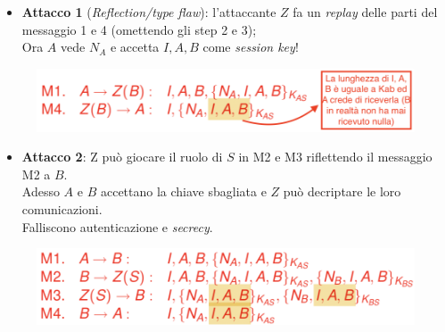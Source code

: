 \documentclass[11pt, a4paper, twoside, italian]{report}
\theoremstyle{plain}
\begin{document}
\begin{multicols}{2}
\begin{itemize}
		\item \textbf{Attacco 1} (\textit{Reflection/type flaw}): l'attaccante $Z$ fa un \textit{replay} delle parti del messaggio 1 e 4 (omettendo gli step 2 e 3);\\
		Ora $A$ vede $N_{A}$ e accetta ${I,A,B}$ come \textit{session key}!
\end{itemize}
	\columnbreak
	\begin{figure}[H]
		\centering
		\includegraphics[scale=0.5]{otway-reestypeflaw2}
	\end{figure}
\end{multicols}

\begin{multicols}{2}
\begin{itemize}
	\item \textbf{Attacco 2}: Z può giocare il ruolo di $S$ in M2 e M3 riflettendo il messaggio M2 a  $B$.\\
	Adesso $A$ e $B$ accettano la chiave sbagliata e $Z$ può decriptare le loro comunicazioni.\\
	Falliscono autenticazione e \textit{secrecy}.
\end{itemize}
\columnbreak
	\begin{figure}[H]
		\centering
		\includegraphics[scale=0.5]{otway-reesattack2}
	\end{figure}
\end{multicols} 
\end{document}
